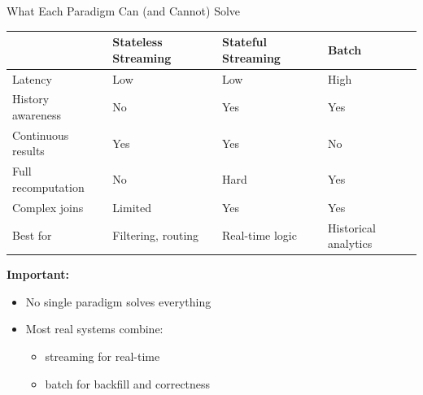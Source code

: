 \documentclass[aspectratio=169]{beamer}
\begin{document}
\begin{frame}{What Each Paradigm Can (and Cannot) Solve}
\small
\begin{tabular}{p{3cm} p{3.2cm} p{3.2cm} p{3.2cm}}
\toprule
 & Stateless Streaming & Stateful Streaming & Batch \\
\midrule
Latency & Low & Low & High \\
History awareness & No & Yes & Yes \\
Continuous results & Yes & Yes & No \\
Full recomputation & No & Hard & Yes \\
Complex joins & Limited & Yes & Yes \\
\midrule
Best for & Filtering, routing & Real-time logic & Historical analytics \\
\bottomrule
\end{tabular}

\vspace{0.4cm}

\textbf{Important:}
\begin{itemize}
    \item No single paradigm solves everything
    \item Most real systems combine:
    \begin{itemize}
        \item streaming for real-time
        \item batch for backfill and correctness
    \end{itemize}
\end{itemize}
\end{frame}
\end{document}
